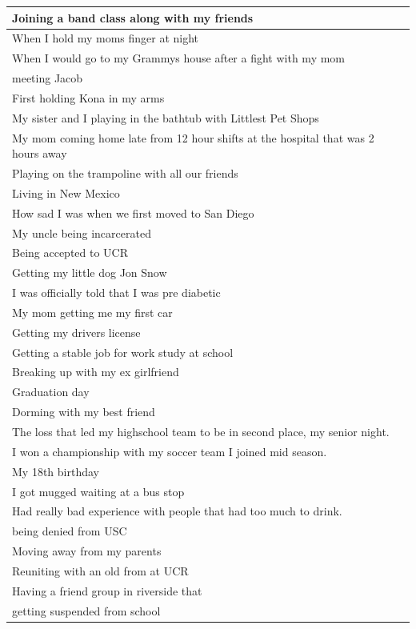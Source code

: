 \documentclass[
  .7em,
  letterpaper,
  DIV=11,
  numbers=noendperiod]{scrartcl}
\begin{document}
\begin{table}
\begin{tabular}{l}
\hline
Joining a band class along with my friends\\
\hline
When I hold my moms finger at night\\
\hline
When I would go to my Grammys house after a fight with my mom\\
\hline
meeting Jacob\\
\hline
First holding Kona in my arms\\
\hline
My sister and I playing in the bathtub with Littlest Pet Shops\\
\hline
My mom coming home late from 12 hour shifts at the hospital that was 2 hours away\\
\hline
Playing on the trampoline with all our friends\\
\hline
Living in New Mexico\\
\hline
How sad I was when we first moved to San Diego\\
\hline
My uncle being incarcerated\\
\hline
Being accepted to UCR\\
\hline
Getting my little dog Jon Snow\\
\hline
I was officially told that I was pre diabetic\\
\hline
My mom getting me my first car\\
\hline
Getting my drivers license\\
\hline
Getting a stable job for work study at school\\
\hline
Breaking up with my ex girlfriend\\
\hline
Graduation day\\
\hline
Dorming with my best friend\\
\hline
The loss that led my highschool team to be in second place, my senior night.\\
\hline
I won a championship with my soccer team I joined mid season.\\
\hline
My 18th birthday\\
\hline
I got mugged waiting at a bus stop\\
\hline
Had  really bad experience with people that had too much to drink.\\
\hline
being denied from USC\\
\hline
Moving away from my parents\\
\hline
Reuniting with an old from at UCR\\
\hline
Having a friend group in riverside that\\
\hline
getting suspended from school\\

\end{tabular}
\end{table}
\end{document}
